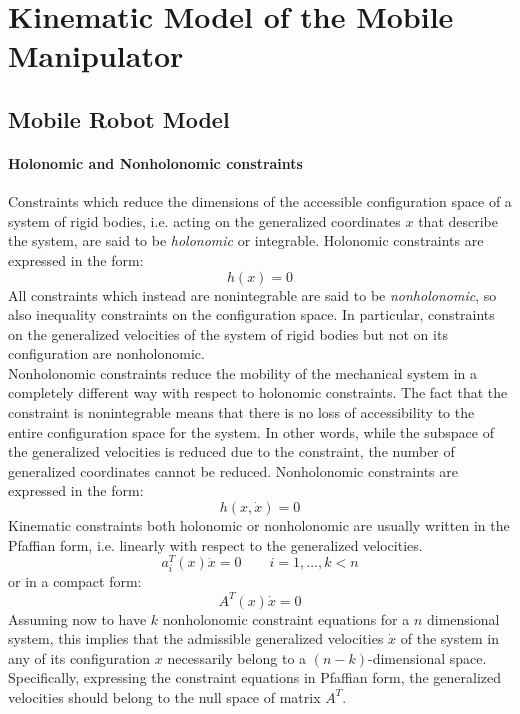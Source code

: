 
\chapter{Kinematic Model of the Mobile Manipulator}
\label{chapter2}
\section{Mobile Robot Model}
\subsubsection{Holonomic and Nonholonomic constraints}
Constraints which reduce the dimensions of the accessible configuration space of a system of rigid bodies, i.e. acting on the generalized coordinates $x$ that describe the system, are said to be \textit{holonomic} or integrable. 
Holonomic constraints are expressed in the form:
\begin{equation}
h\left( x\right) =0
\end{equation}
All constraints which instead are nonintegrable are said to be \textit{nonholonomic}, so also inequality constraints on the configuration space. In particular, constraints on the generalized velocities of the system of rigid bodies but not on its configuration are nonholonomic.\\
Nonholonomic constraints reduce the mobility of the mechanical system in a completely different way with respect to holonomic constraints. The fact that the constraint is nonintegrable means that there is no loss of accessibility to the entire configuration space for the system. In other words, while the subspace of the generalized velocities is reduced due to the constraint, the number of generalized coordinates cannot be reduced.
Nonholonomic constraints are expressed in the form:
\begin{equation}
h( x,\dot{x}) =0
\end{equation}
Kinematic constraints both holonomic or nonholonomic are usually written in the Pfaffian form, i.e. linearly with respect to the generalized velocities.
\begin{equation}
a_i^T \left( x \right)\dot{x} =0 \qquad i=1,...,k<n 
\end{equation}
or in a compact form:
\begin{equation} 
A^T \left( x \right)\dot{x} =0  
\end{equation}
Assuming now to have $k$ nonholonomic constraint equations for a $n$ dimensional system, this implies that the admissible generalized velocities $\dot{x}$ of the system in any of its configuration $x$ necessarily belong to a $(n-k)$-dimensional space. Specifically, expressing the constraint equations in Pfaffian form, the generalized velocities should belong to the null space of matrix $A^T$.\\
